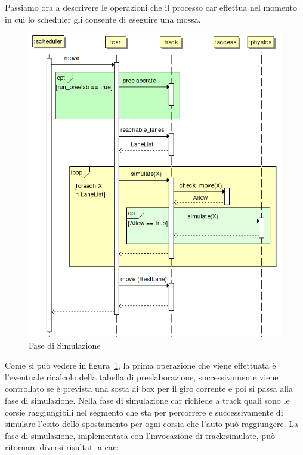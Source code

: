 \documentclass[11pt,a4paper]{report}
\begin{document}
Passiamo ora a descrivere le operazioni che il processo car effettua nel momento in cui lo scheduler gli consente di eseguire una mossa.
\begin{figure}
\includegraphics[width=\textwidth]{diagrammi/Simulation}
\caption{Fase di Simulazione}
\label{fig:simulation}
\end{figure}
Come si può vedere in figura~\ref{fig:simulation}, la prima operazione che viene effettuata è l'eventuale ricalcolo della tabella di preelaborazione, successivamente viene controllato se è prevista una sosta ai box per il giro corrente e poi si passa alla fase di simulazione.
Nella fase di simulazione car richiede a track quali sono le corsie raggiungibili nel segmento che sta per percorrere e successivamente di simulare l'esito dello spostamento per ogni corsia che l'auto può raggiungere.
La fase di simulazione, implementata con l'invocazione di track:simulate, può ritornare diversi risultati a car:
\end{document}
